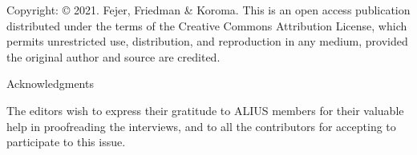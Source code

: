 
\clearpage
\thispagestyle{empty}
\vspace*{4.0cm}
{\AliusLatoLight\fontsize{12}{16}\selectfont
Copyright: © 2021. Fejer, Friedman \& Koroma. This is an open access publication distributed under the terms of the Creative Commons Attribution License, which permits unrestricted use, distribution, and reproduction in any medium, provided the original author and source are credited.\par
}
\clearpage

\clearpage
\thispagestyle{empty}
\vspace*{3.7cm}
{\AliusLato\fontsize{20}{24}\selectfont Acknowledgments\par}
\vspace{1.1cm}
{\fontsize{14}{17}\selectfont
The editors wish to express their gratitude to ALIUS members for their valuable help in proofreading the interviews, and to all the contributors for accepting to participate to this issue.\par
}
\clearpage

\AliusIssueBlankPage

